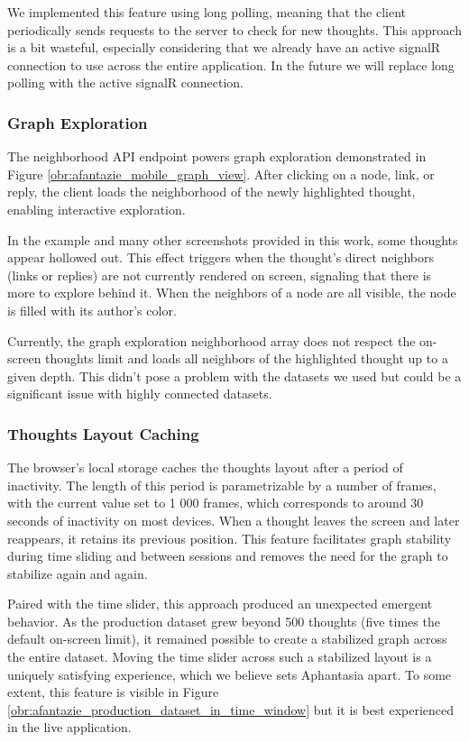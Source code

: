 We implemented this feature using long polling, meaning that the client periodically sends
requests to the server to check for new thoughts. This approach is a bit wasteful, especially considering that we already have an active
signalR connection to use across the entire application.
In the future we will replace long polling with the active signalR connection.

\subsubsection*{Graph Exploration}
The neighborhood API endpoint powers graph exploration demonstrated in Figure \ref{obr:afantazie_mobile_graph_view}.
After clicking on a node, link, or reply, the client loads the neighborhood of the newly highlighted thought, enabling interactive exploration.

In the example and many other screenshots provided in this work, some thoughts appear hollowed out.
This effect triggers when the thought's direct neighbors (links or replies) are not currently rendered on screen, signaling that there is more to explore behind it.
When the neighbors of a node are all visible, the node is filled with its author's color.

Currently, the graph exploration neighborhood array does not respect the on-screen thoughts limit and loads all neighbors of the highlighted thought up to a given depth.
This didn't pose a problem with the datasets we used but could be a significant issue with highly connected datasets.

\subsubsection*{Thoughts Layout Caching}
The browser's local storage caches the thoughts layout after a period of inactivity.
The length of this period is parametrizable by a number of frames,
with the current value set to 1 000 frames, which corresponds to around 30 seconds of inactivity on most devices.
When a thought leaves the screen and later reappears, it retains its previous position.
This feature facilitates graph stability during time sliding and between sessions and removes the need for the graph to stabilize again and again.

Paired with the time slider, this approach produced an unexpected emergent behavior. As the \gls{production} dataset grew beyond 500 thoughts (five times the default on-screen limit), it remained possible to create a stabilized graph across the entire dataset.
Moving the time slider across such a stabilized layout is a uniquely satisfying experience, which we believe sets Aphantasia apart.
To some extent, this feature is visible in Figure \ref{obr:afantazie_production_dataset_in_time_window} but it is best experienced in the live application.

